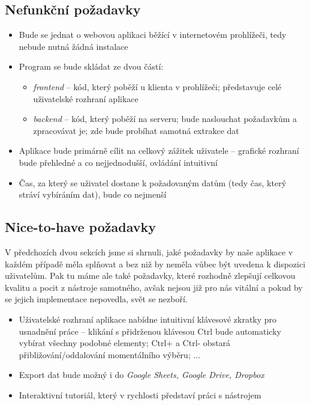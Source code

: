 \documentclass[thesis=B,czech]{FITthesis}[2012/06/26]
\begin{document}
\subsection{Nefunkční požadavky}
\begin{itemize}
	\item Bude se jednat o webovou aplikaci běžící v internetovém prohlížeči, tedy nebude nutná žádná instalace
	\item Program se bude skládat ze dvou částí:
	\begin{itemize}
		\item \emph{frontend} -- kód, který poběží u klienta v prohlížeči; představuje celé uživatelské rozhraní aplikace
		\item \emph{backend} -- kód, který poběží na serveru; bude naslouchat požadavkům a zpracovávat je; zde bude probíhat samotná extrakce dat
	\end{itemize}
	\item Aplikace bude primárně cílit na celkový zážitek uživatele -- grafické rozhraní bude přehledné a co nejjednodušší, ovládání intuitivní
	\item Čas, za který se uživatel dostane k požadovaným datům (tedy čas, který stráví vybíráním dat), bude co nejmenší
\end{itemize}

\subsection{Nice-to-have požadavky}
V předchozích dvou sekcích jsme si shrnuli, jaké požadavky by naše aplikace v každém případě měla splňovat a bez niž by neměla vůbec být uvedena k dispozici uživatelům. Pak tu máme ale také požadavky, které rozhodně zlepšují celkovou kvalitu a pocit z nástroje samotného, avšak nejsou již pro nás vitální a pokud by se jejich implementace nepovedla, svět se nezboří.
\begin{itemize}
	\item Uživatelské rozhraní aplikace nabídne intuitivní klávesové zkratky pro usnadnění práce -- klikání s přidrženou klávesou \textsf{Ctrl} bude automaticky vybírat všechny podobné elementy; \textsf{Ctrl+} a \textsf{Ctrl-} obstará přibližování/oddalování momentálního výběru; ...
	\item Export dat bude možný i do \emph{Google Sheets, Google Drive, Dropbox}
	\item Interaktivní tutoriál, který v rychlosti představí práci s nástrojem
\end{itemize}
\end{document}
